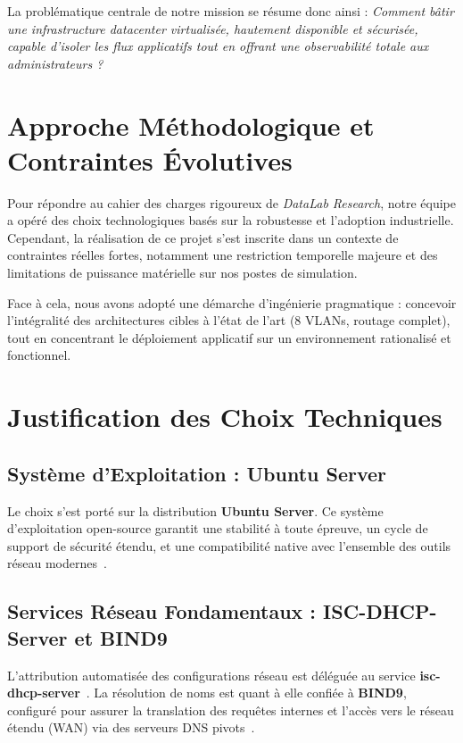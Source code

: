 La problématique centrale de notre mission se résume donc ainsi : \textit{Comment bâtir une infrastructure datacenter virtualisée, hautement disponible et sécurisée, capable d'isoler les flux applicatifs tout en offrant une observabilité totale aux administrateurs ?}

\section{Approche Méthodologique et Contraintes Évolutives}
Pour répondre au cahier des charges rigoureux de \textit{DataLab Research}, notre équipe a opéré des choix technologiques basés sur la robustesse et l'adoption industrielle. Cependant, la réalisation de ce projet s'est inscrite dans un contexte de contraintes réelles fortes, notamment une restriction temporelle majeure  et des limitations de puissance matérielle sur nos postes de simulation. 

Face à cela, nous avons adopté une démarche d'ingénierie pragmatique : concevoir l'intégralité des architectures cibles à l'état de l'art (8 VLANs, routage complet), tout en concentrant le déploiement applicatif sur un environnement rationalisé et fonctionnel.

\section{Justification des Choix Techniques}

\subsection{Système d'Exploitation : Ubuntu Server}
Le choix s'est porté sur la distribution \textbf{Ubuntu Server}. Ce système d'exploitation open-source garantit une stabilité à toute épreuve, un cycle de support de sécurité étendu, et une compatibilité native avec l'ensemble des outils réseau modernes~\cite{ubuntu_doc}.

\subsection{Services Réseau Fondamentaux : ISC-DHCP-Server et BIND9}
L'attribution automatisée des configurations réseau est déléguée au service \textbf{isc-dhcp-server}~\cite{dhcp_doc}. La résolution de noms est quant à elle confiée à \textbf{BIND9}, configuré pour assurer la translation des requêtes internes et l'accès vers le réseau étendu (WAN) via des serveurs DNS pivots~\cite{bind9_doc}.

